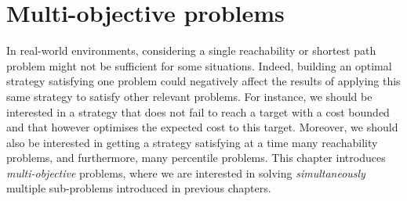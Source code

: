 \chapter{Multi-objective problems}\label{multi-objective-chapter}
In real-world environments, considering a single reachability or shortest path problem might not be sufficient for some situations.
Indeed, building an optimal strategy satisfying one problem could negatively affect the results of applying this same strategy to satisfy other relevant problems.
For instance, we should be interested in a strategy that does not fail to reach a target with a cost bounded and that however optimises the expected cost to this target.
Moreover, we should also be interested in getting a strategy satisfying at a time many reachability problems, and furthermore, many percentile problems.
This chapter introduces \textit{multi-objective} problems, where we are interested in solving \textit{simultaneously} multiple sub-problems introduced in previous chapters.
